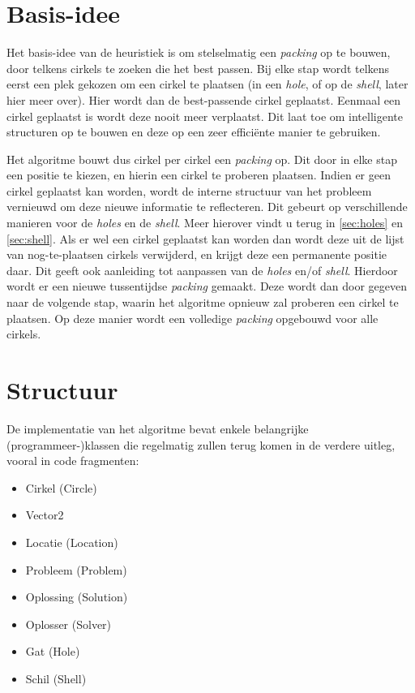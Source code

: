 \documentclass[12pt,a4paper,oneside]{book}
\begin{document}
\section{Basis-idee}

Het basis-idee van de heuristiek is om stelselmatig een \textit{packing} op te bouwen, door telkens cirkels te zoeken die het best passen.
Bij elke stap wordt telkens eerst een plek gekozen om een cirkel te plaatsen (in een \textit{hole}, of op de \textit{shell}, later hier meer over).
Hier wordt dan de best-passende cirkel geplaatst.
Eenmaal een cirkel geplaatst is wordt deze nooit meer verplaatst.
Dit laat toe om intelligente structuren op te bouwen en deze op een zeer efficiënte manier te gebruiken.

Het algoritme bouwt dus cirkel per cirkel een \textit{packing} op.
Dit door in elke stap een positie te kiezen, en hierin een cirkel te proberen plaatsen.
Indien er geen cirkel geplaatst kan worden, wordt de interne structuur van het probleem vernieuwd om deze nieuwe informatie te reflecteren.
Dit gebeurt op verschillende manieren voor de \textit{holes} en de \textit{shell}.
Meer hierover vindt u terug in \autoref{sec:holes} en \autoref{sec:shell}.
Als er wel een cirkel geplaatst kan worden dan wordt deze uit de lijst van nog-te-plaatsen cirkels verwijderd, en krijgt deze een permanente positie daar.
Dit geeft ook aanleiding tot aanpassen van de \textit{holes} en/of \textit{shell}.
Hierdoor wordt er een nieuwe tussentijdse \textit{packing} gemaakt.
Deze wordt dan door gegeven naar de volgende stap, waarin het algoritme opnieuw zal proberen een cirkel te plaatsen.
Op deze manier wordt een volledige \textit{packing} opgebouwd voor alle cirkels.

\section{Structuur}

De implementatie van het algoritme bevat enkele belangrijke (programmeer-)klassen die regelmatig zullen terug komen in de verdere uitleg, vooral in code fragmenten:

\begin{itemize} 
\item Cirkel (Circle)
\item Vector2
\item Locatie (Location)
\item Probleem (Problem)
\item Oplossing (Solution)
\item Oplosser (Solver)
\item Gat (Hole)
\item Schil (Shell)
\end{itemize}
\end{document}
